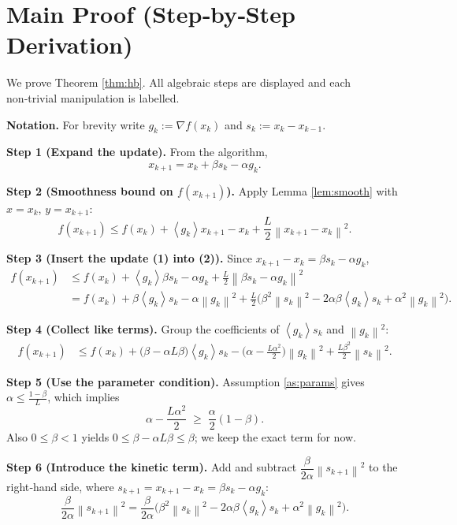 \documentclass{article}
\newcommand{\norm}[1]{\left\lVert#1\right\rVert}
\newcommand{\inner}[1]{\left\langle#1\right\rangle}
\begin{document}
\section*{Main Proof (Step‑by‑Step Derivation)}
We prove Theorem \ref{thm:hb}.  All algebraic steps are displayed and each non‑trivial manipulation is labelled.

\bigskip
\noindent\textbf{Notation.} For brevity write $g_k:=\nabla f(x_k)$ and $s_k:=x_k-x_{k-1}$.

\noindent\textbf{Step 1 (Expand the update).}  
From the algorithm,
\[
x_{k+1}=x_k+\beta s_k-\alpha g_k. \tag{1}
\]

\noindent\textbf{Step 2 (Smoothness bound on $f(x_{k+1})$).}  
Apply Lemma \ref{lem:smooth} with $x=x_k$, $y=x_{k+1}$:
\[
f(x_{k+1})\le f(x_k)+\inner{g_k}{x_{k+1}-x_k}+\frac{L}{2}\norm{x_{k+1}-x_k}^2.
\tag{2}
\]

\noindent\textbf{Step 3 (Insert the update (1) into (2)).}  
Since $x_{k+1}-x_k=\beta s_k-\alpha g_k$,
\[
\begin{aligned}
f(x_{k+1}) &\le f(x_k)+\inner{g_k}{\beta s_k-\alpha g_k}
            +\frac{L}{2}\norm{\beta s_k-\alpha g_k}^2\\
&= f(x_k)+\beta\inner{g_k}{s_k}-\alpha\norm{g_k}^2
   +\frac{L}{2}\bigl(\beta^2\norm{s_k}^2-2\alpha\beta\inner{g_k}{s_k}+\alpha^2\norm{g_k}^2\bigr).
\end{aligned}
\tag{3}
\]

\noindent\textbf{Step 4 (Collect like terms).}  
Group the coefficients of $\inner{g_k}{s_k}$ and $\norm{g_k}^2$:
\[
\begin{aligned}
f(x_{k+1}) &\le f(x_k)
   +\bigl(\beta-\alpha L\beta\bigr)\inner{g_k}{s_k}
   -\bigl(\alpha-\tfrac{L\alpha^2}{2}\bigr)\norm{g_k}^2
   +\tfrac{L\beta^2}{2}\norm{s_k}^2 .
\end{aligned}
\tag{4}
\]

\noindent\textbf{Step 5 (Use the parameter condition).}  
Assumption \ref{as:params} gives $\alpha\le\frac{1-\beta}{L}$, which implies
\[
\alpha-\frac{L\alpha^2}{2}\;\ge\;\frac{\alpha}{2}(1-\beta). \tag{5}
\]
Also $0\le\beta<1$ yields $0\le\beta-\alpha L\beta\le\beta$; we keep the exact term for now.

\noindent\textbf{Step 6 (Introduce the kinetic term).}  
Add and subtract $\dfrac{\beta}{2\alpha}\norm{s_{k+1}}^2$ to the right‑hand side, where $s_{k+1}=x_{k+1}-x_k=\beta s_k-\alpha g_k$:
\[
\frac{\beta}{2\alpha}\norm{s_{k+1}}^2
   =\frac{\beta}{2\alpha}\bigl(\beta^2\norm{s_k}^2-2\alpha\beta\inner{g_k}{s_k}+\alpha^2\norm{g_k}^2\bigr).
\tag{6}
\]
\end{document}
